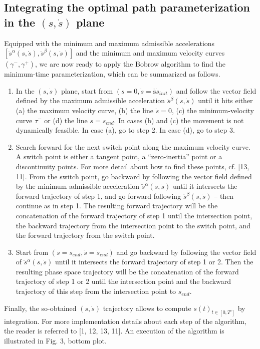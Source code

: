 \documentclass[journal]{IEEEtran}
\begin{document}
\subsection{Integrating the optimal path parameterization in the $(s,\dot{s})$ plane}
Equipped with the minimum and maximum admissible
accelerations $[\ddot{s}^{\alpha}(s,\dot{s}),\ddot{s}^{\beta}(s,\dot{s})]$ and the minimum and maximum velocity curves $(\gamma^{-},\gamma^{+})$, we are now ready to apply the Bobrow algorithm to find the minimum-time parameterization, which can be summarized as follows.

\begin{enumerate} %
\item 
In the $(s, \dot{s})$ plane, start from $(s = 0,\dot{s} = ṡ\dot{s}_{init})$ and follow the vector field defined by the maximum admissible acceleration $\ddot{s}^{\beta}(s,\dot{s})$ until it hits either (a) the maximum velocity curve, (b) the line $\dot{s} = 0$, (c) the minimum-velocity curve $\tau^{-}$ or (d) the line $s = s_{end}$.
In cases (b) and (c) the movement is not dynamically
feasible. In case (a), go to step 2. In case (d), go to
step 3.
\item 
Search forward for the next switch point along the maximum velocity curve. A switch point is either a tangent point, a “zero-inertia” point or a discontinuity points. For more detail about how to find these points, cf. [13, 11]. From the switch point, go backward by following the vector field defined by the minimum admissible acceleration $\ddot{s}^{\alpha}(s,\dot{s})$ until it intersects the forward trajectory of step 1, and go forward following $\ddot{s}^{\beta}(s,\dot{s})$ -- then continue as in step 1. The resulting forward trajectory will be the concatenation of the forward trajectory of step 1 until the intersection point, the backward trajectory from the intersection point to the switch point, and the forward trajectory from the switch point.
\item
Start from $(s = s_{end},\dot{s} =\dot{s}_{end})$ and go backward by following the vector field of $\ddot{s}^{\alpha}(s,\dot{s})$ until it intersects the forward trajectory of step 1 or 2. Then the resulting phase space trajectory will be the concatenation of the forward trajectory of step 1 or 2 until the intersection point and the backward trajectory of this step from the intersection point to $s_{end}$.
\end{enumerate}

Finally, the so-obtained $(s,\dot{s})$ trajectory allows to compute $s(t)_{t\in[0,T']}$ by integration. For more implementation details about each step of the algorithm, the reader is referred to [1, 12, 13, 11]. An execution of the algorithm is illustrated in Fig. 3, bottom plot.
\end{document}

